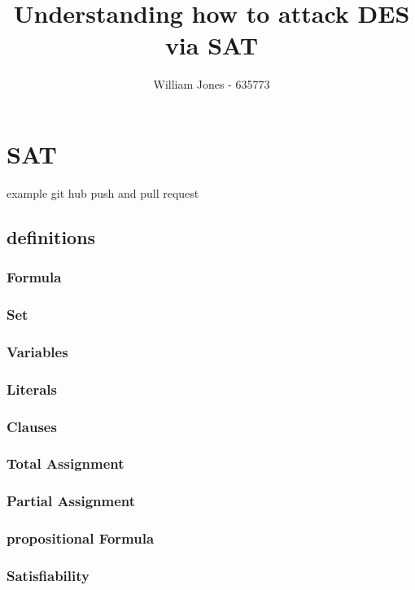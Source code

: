 \documentclass[11pt,a4paper]{article}
\author{William Jones - 635773}
\begin{document}
\title{Understanding how to attack DES via SAT}
\maketitle
\thispagestyle{empty}
\setcounter{page}{1}
\newpage
\tableofcontents
\clearpage


\section{SAT}
example git hub push and pull request
\subsection{definitions}
\subsubsection{Formula}
\subsubsection{Set}
\subsubsection{Variables}
\subsubsection{Literals}
\subsubsection{Clauses}
\subsubsection{Total Assignment}
\subsubsection{Partial Assignment}
\subsubsection{propositional Formula}
\subsubsection{Satisfiability}
\end{document}
